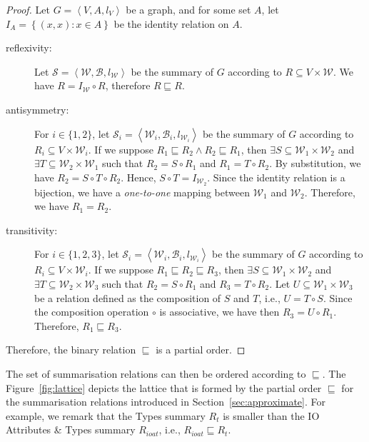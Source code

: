 \begin{proof}
	Let $G=\left\langle V, A, l_V \right\rangle$ be a graph, and for some set $A$, let $I_A = \left\lbrace (x, x) : x \in A \right\rbrace$ be the identity relation on $A$.
	\begin{description}
		\item[reflexivity:] Let $\mathcal{S} = \left\langle \mathcal{W}, \mathcal{B}, l_{\mathcal{W}} \right\rangle$ be the summary of $G$ according to $R \subseteq V \times \mathcal{W}$. We have $R = I_\mathcal{W} \circ R$, therefore $R \sqsubseteq R$.
		\item[antisymmetry:] For $i \in \{1, 2\}$, let $\mathcal{S}_i = \left\langle \mathcal{W}_i, \mathcal{B}_i, l_{\mathcal{W}_i} \right\rangle$ be the summary of $G$ according to $R_i \subseteq V \times \mathcal{W}_i$. If we suppose $R_1 \sqsubseteq R_2 \wedge R_2 \sqsubseteq R_1$, then $\exists S \subseteq \mathcal{W}_1 \times \mathcal{W}_2$ and $\exists T \subseteq \mathcal{W}_2 \times \mathcal{W}_1$ such that $R_2 = S \circ R_1$ and $R_1 = T \circ R_2$. By substitution, we have $R_2 = S \circ T \circ R_2$. Hence, $S \circ T = I_{\mathcal{W}_2}$. Since the identity relation is a bijection, we have a \emph{one-to-one} mapping between $\mathcal{W}_1$ and $\mathcal{W}_2$. Therefore, we have $R_1 = R_2$.
		\item[transitivity:] For $i \in \{1, 2, 3\}$, let $\mathcal{S}_i = \left\langle \mathcal{W}_i, \mathcal{B}_i, l_{\mathcal{W}_i} \right\rangle$ be the summary of $G$ according to $R_i \subseteq V \times \mathcal{W}_i$. If we suppose $R_1 \sqsubseteq R_2 \sqsubseteq R_3$, then $\exists S \subseteq \mathcal{W}_1 \times \mathcal{W}_2$ and $\exists T \subseteq \mathcal{W}_2 \times \mathcal{W}_3$ such that $R_2 = S \circ R_1$ and $R_3 = T \circ R_2$. Let $U \subseteq \mathcal{W}_1 \times \mathcal{W}_3$ be a relation defined as the composition of $S$ and $T$, i.e., $U = T \circ S$. Since the composition operation $\circ$ is associative, we have then $R_3 = U \circ R_1$. Therefore, $R_1 \sqsubseteq R_3$.
	\end{description}
	Therefore, the binary relation $\sqsubseteq$ is a partial order.
\end{proof}

The set of summarisation relations can then be ordered according to $\sqsubseteq$. The Figure~\ref{fig:lattice} depicts the lattice that is formed by the partial order $\sqsubseteq$ for the summarisation relations introduced in Section~\ref{sec:approximate}. For example, we remark that the Types summary $R_t$ is smaller than the IO Attributes \& Types summary $R_{ioat}$, i.e., $R_{ioat} \sqsubseteq R_t$.

